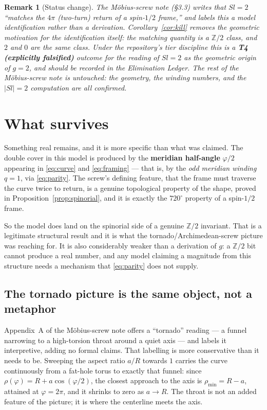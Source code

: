 \documentclass[11pt,a4paper]{article}
\newtheorem{remark}{Remark}
\begin{document}
\begin{remark}[Status change]
The M\"obius-screw note (\S3.3) writes that $Sl = 2$ ``matches the $4\pi$
(two-turn) return of a spin-$1/2$ frame,'' and labels this a model
identification rather than a derivation.  Corollary~\ref{cor:kill}
removes the geometric motivation for the identification itself: the
matching quantity is a $\mathbb{Z}/2$ class, and $2$ and $0$ are the same
class.  Under the repository's tier discipline this is a
\textbf{T4 (explicitly falsified)} outcome for the reading of $Sl = 2$ as
the geometric origin of $g = 2$, and should be recorded in the
Elimination Ledger.  The rest of the M\"obius-screw note is untouched:
the geometry, the winding numbers, and the $|Sl| = 2$ computation are all
confirmed.
\end{remark}

\section{What survives}

Something real remains, and it is more specific than what was claimed.
The double cover in this model is produced by the \textbf{meridian
half-angle} $\varphi/2$ appearing in \eqref{eq:curve} and
\eqref{eq:framing} --- that is, by the \emph{odd meridian winding}
$q = 1$, via \eqref{eq:parity}.  The screw's defining feature, that the
frame must traverse the curve twice to return, is a genuine topological
property of the shape, proved in Proposition~\ref{prop:spinorial}, and it
is exactly the $720^\circ$ property of a spin-$1/2$ frame.

So the model does land on the spinorial side of a genuine $\mathbb{Z}/2$
invariant.  That is a legitimate structural result and it is what the
tornado/Archimedean-screw picture was reaching for.  It is also
considerably weaker than a derivation of $g$: a $\mathbb{Z}/2$ bit cannot
produce a real number, and any model claiming a magnitude from this
structure needs a mechanism that \eqref{eq:parity} does not supply.

\subsection{The tornado picture is the same object, not a metaphor}
\label{sec:throat}

Appendix~A of the M\"obius-screw note offers a ``tornado'' reading --- a
funnel narrowing to a high-torsion throat around a quiet axis --- and
labels it interpretive, adding no formal claims.  That labelling is more
conservative than it needs to be.  Sweeping the aspect ratio $a/R$
towards $1$ carries the curve continuously from a fat-hole torus to
exactly that funnel: since $\rho(\varphi) = R + a\cos(\varphi/2)$, the
closest approach to the axis is $\rho_{\min} = R - a$, attained at
$\varphi = 2\pi$, and it shrinks to zero as $a \to R$.  The throat is not
an added feature of the picture; it is where the centerline meets the
axis.
\end{document}
